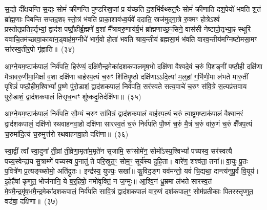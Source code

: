 {\anuvakamend[{आ॒ग्ने॒यं द्विच॑त्वारिꣳशत्}]}%

स॒द्यो दी᳚क्षयन्ति स॒द्यः सोमं॑ क्रीणन्ति पुण्डरिस्र॒जां प्र य॑च्छति द॒शभि॑र्वथ्सत॒रैः सोमं॑ क्रीणाति दश॒पेयो॑ भवति श॒तं ब्रा᳚ह्म॒णाः पि॑बन्ति सप्तद॒शꣴ स्तो॒त्रं भ॑वति प्राका॒शाव॑ध्व॒र्यवे॑ ददाति॒ स्रज॑मुद्गा॒त्रे रु॒क्मꣳ होत्रे\-ऽश्वं॑ प्रस्तोतृप्रतिह॒र्तृभ्यां॒ द्वाद॑श पष्ठौ॒हीर्ब्र॒ह्मणे॑ व॒शां मै᳚त्रावरु॒णाय॑र्\mbox{}ष॒भं ब्रा᳚ह्मणाच्छ॒ꣳ॒सिने॒ वास॑सी नेष्टापो॒तृभ्या॒ꣴ॒ स्थूरि॑ यवाचि॒तम॑च्छावा॒काया॑न॒ड्वाह॑म॒ग्नीधे॑ भार्ग॒वो होता॑ भवति श्राय॒न्तीयं॑ ब्रह्मसा॒मं भ॑वति वारव॒न्तीय॑मग्निष्टोमसा॒मꣳ सा॑रस्व॒तीर॒पो गृ॑ह्णाति॥~(३४)\ip

{\anuvakamend[{वा॒र॒व॒न्तीयं॑ च॒त्वारि॑ च}]}%

आ॒ग्ने॒यम॒ष्टा\-क॑पालं॒ निर्व॑पति॒ हिर॑ण्यं॒ दक्षि॑णै॒न्द्रमेका॑\-दश\-कपालमृष॒भो दक्षि॑णा वैश्वदे॒वं च॒रुं पि॒शङ्गी॑ पष्ठौ॒ही दक्षि॑णा मैत्रावरु॒णीमा॒मिक्षां᳚ व॒शा दक्षि॑णा बार्\mbox{}हस्प॒त्यं च॒रुꣳ शि॑तिपृ॒ष्ठो दक्षि॑णा\-ऽऽ\-दि॒त्यां म॒ल्॒\mbox{}हां ग॒र्भिणी॒मा ल॑भते मारु॒तीं पृश्ञिं॑ पष्ठौ॒हीम॒श्वि\-भ्यां᳚ पू॒ष्णे पु॑रो॒डाशं॒ द्वाद॑श\-कपालं॒ निर्व॑पति॒ सर॑स्वते सत्य॒वाचे॑ च॒रुꣳ स॑वि॒त्रे स॒त्यप्र॑सवाय पुरो॒डाशं॒ द्वाद॑श\-कपालं तिसृध॒न्वꣳ शु॑ष्कदृ॒तिर्दक्षि॑णा॥~(३५)\ip

{\anuvakamend[{आ॒ग्ने॒यꣳ स॒प्तच॑त्वारिꣳशत्}]}%

आ॒ग्ने॒यम॒ष्टा\-क॑पालं॒ निर्व॑पति सौ॒म्यं च॒रुꣳ सा॑वि॒त्रं द्वाद॑श\-कपालं बार्\mbox{}हस्प॒त्यं च॒रुं त्वा॒ष्ट्रम॒ष्टाक॑पालं वैश्वान॒रं द्वाद॑श\-कपालं॒ दक्षि॑णो रथवाहनवा॒हो दक्षि॑णा सारस्व॒तं च॒रुं निर्व॑पति पौ॒ष्णं च॒रुं मै॒त्रं च॒रुं वा॑रु॒णं च॒रुं क्षै᳚त्रप॒त्यं च॒रुमा॑दि॒त्यं च॒रुमुत्त॑रो रथवाहनवा॒हो दक्षि॑णा॥~(३६)\ip

{\anuvakamend[{आ॒ग्ने॒यं चतु॑स्त्रिꣳशत्}]}%

स्वा॒द्वीं त्वा᳚ स्वा॒दुना॑ ती॒व्रां ती॒व्रेणा॒मृता॑म॒मृते॑न सृ॒जामि॒ सꣳसोमे॑न॒ सोमो᳚\-ऽस्य॒श्वि\-भ्यां᳚ पच्यस्व॒ सर॑स्वत्यै पच्य॒स्वेन्द्रा॑य सु॒त्राम्णे॑ पच्यस्व पु॒नातु॑ ते परि॒स्रुत॒ꣳ॒ सोम॒ꣳ॒ सूर्य॑स्य दुहि॒ता। वारे॑ण॒ शश्व॑ता॒ तना᳚॥ वा॒युः पू॒तः प॒वित्रे॑ण प्र॒त्यङ्ख्सोमो॒ अति॑द्रुतः। इन्द्र॑स्य॒ युज्यः॒ सखा᳚॥ कु॒विद॒ङ्ग यव॑मन्तो॒ यवं॑ चि॒द्यथा॒ दान्त्य॑नुपू॒र्वं वि॒यूय॑। इ॒हेहै॑षां कृणुत॒ भोज॑नानि॒ ये ब॒र्॒\mbox{}हिषो॒ नमो॑वृक्तिं॒ न ज॒ग्मुः॥ आ॒श्वि॒नं धू॒म्रमा ल॑भते सारस्व॒तं मे॒षमै॒न्द्रमृ॑ष॒भमै॒न्द्रमेका॑\-दश\-कपालं॒ निर्व॑पति सावि॒त्रं द्वाद॑श\-कपालं वारु॒णं दश॑\-कपाल॒ꣳ॒ सोम॑प्रतीकाः पितरस्तृप्णुत॒ वड॑बा॒ दक्षि॑णा॥~(३७)\ip

{\anuvakamend[{भोज॑नानि॒ षड्विꣳ॑शतिश्च}]}%


